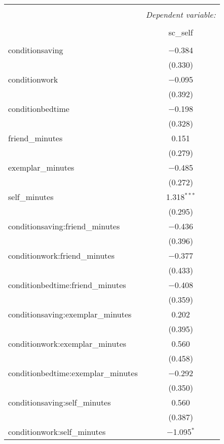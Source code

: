 
\begin{table}[!htbp] \centering 
  \caption{} 
  \label{} 
\begin{tabular}{@{\extracolsep{5pt}}lc} 
\\[-1.8ex]\hline 
\hline \\[-1.8ex] 
 & \multicolumn{1}{c}{\textit{Dependent variable:}} \\ 
\cline{2-2} 
\\[-1.8ex] & sc\_self \\ 
\hline \\[-1.8ex] 
 conditionsaving & $-$0.384 \\ 
  & (0.330) \\ 
  conditionwork & $-$0.095 \\ 
  & (0.392) \\ 
  conditionbedtime & $-$0.198 \\ 
  & (0.328) \\ 
  friend\_minutes & 0.151 \\ 
  & (0.279) \\ 
  exemplar\_minutes & $-$0.485 \\ 
  & (0.272) \\ 
  self\_minutes & 1.318$^{***}$ \\ 
  & (0.295) \\ 
  conditionsaving:friend\_minutes & $-$0.436 \\ 
  & (0.396) \\ 
  conditionwork:friend\_minutes & $-$0.377 \\ 
  & (0.433) \\ 
  conditionbedtime:friend\_minutes & $-$0.408 \\ 
  & (0.359) \\ 
  conditionsaving:exemplar\_minutes & 0.202 \\ 
  & (0.395) \\ 
  conditionwork:exemplar\_minutes & 0.560 \\ 
  & (0.458) \\ 
  conditionbedtime:exemplar\_minutes & $-$0.292 \\ 
  & (0.350) \\ 
  conditionsaving:self\_minutes & 0.560 \\ 
  & (0.387) \\ 
  conditionwork:self\_minutes & $-$1.095$^{*}$ \\ 

\end{tabular}
\end{table}
